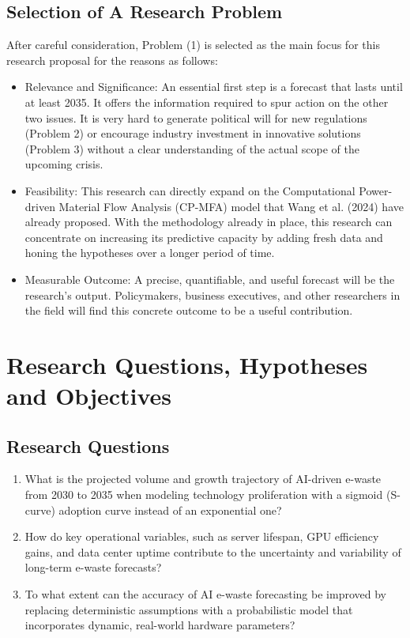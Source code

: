 \documentclass[a4paper, 12pt]{article}
\begin{document}
\subsection*{Selection of A Research Problem}
After careful consideration, Problem (1) is selected as the main focus for this research proposal for the reasons as follows: 

\begin{itemize}
	\item Relevance and Significance: An essential first step is a forecast that lasts until at least 2035. It offers the information required to spur action on the other two issues. It is very hard to generate political will for new regulations (Problem 2) or encourage industry investment in innovative solutions (Problem 3) without a clear understanding of the actual scope of the upcoming crisis.
	
	\item Feasibility: This research can directly expand on the Computational Power-driven Material Flow Analysis (CP-MFA) model that Wang et al. (2024) have already proposed. With the methodology already in place, this research can concentrate on increasing its predictive capacity by adding fresh data and honing the hypotheses over a longer period of time.
	
	\item Measurable Outcome: A precise, quantifiable, and useful forecast will be the research's output.  Policymakers, business executives, and other researchers in the field will find this concrete outcome to be a useful contribution.
\end{itemize}

\section{Research Questions, Hypotheses and Objectives}
\subsection*{Research Questions}
\begin{enumerate}
	\item What is the projected volume and growth trajectory of AI-driven e-waste from 2030 to 2035 when modeling technology proliferation with a sigmoid (S-curve) adoption curve instead of an exponential one?
	\item How do key operational variables, such as server lifespan, GPU efficiency gains, and data center uptime contribute to the uncertainty and variability of long-term e-waste forecasts?
	\item To what extent can the accuracy of AI e-waste forecasting be improved by replacing deterministic assumptions with a probabilistic model that incorporates dynamic, real-world hardware parameters?
\end{enumerate}
\end{document}
